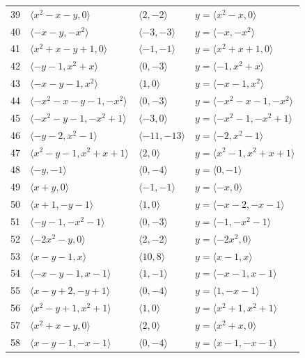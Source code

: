 \documentclass[11pt]{article}
\begin{document}
\begin{longtable}{@{}rlll@{}}
39 & $\langle x^{2}-x-y,0\rangle$ & $\langle 2,-2\rangle$ & $y=\langle x^{2}-x,0\rangle$\\
40 & $\langle -x-y,-x^{2}\rangle$ & $\langle -3,-3\rangle$ & $y=\langle -x,-x^{2}\rangle$\\
41 & $\langle x^{2}+x-y+1,0\rangle$ & $\langle -1,-1\rangle$ & $y=\langle x^{2}+x+1,0\rangle$\\
42 & $\langle -y-1,x^{2}+x\rangle$ & $\langle 0,-3\rangle$ & $y=\langle -1,x^{2}+x\rangle$\\
43 & $\langle -x-y-1,x^{2}\rangle$ & $\langle 1,0\rangle$ & $y=\langle -x-1,x^{2}\rangle$\\
44 & $\langle -x^{2}-x-y-1,-x^{2}\rangle$ & $\langle 0,-3\rangle$ & $y=\langle -x^{2}-x-1,-x^{2}\rangle$\\
45 & $\langle -x^{2}-y-1,-x^{2}+1\rangle$ & $\langle -3,0\rangle$ & $y=\langle -x^{2}-1,-x^{2}+1\rangle$\\
46 & $\langle -y-2,x^{2}-1\rangle$ & $\langle -11,-13\rangle$ & $y=\langle -2,x^{2}-1\rangle$\\
47 & $\langle x^{2}-y-1,x^{2}+x+1\rangle$ & $\langle 2,0\rangle$ & $y=\langle x^{2}-1,x^{2}+x+1\rangle$\\
48 & $\langle -y,-1\rangle$ & $\langle 0,-4\rangle$ & $y=\langle 0,-1\rangle$\\
49 & $\langle x+y,0\rangle$ & $\langle -1,-1\rangle$ & $y=\langle -x,0\rangle$\\
50 & $\langle x+1,-y-1\rangle$ & $\langle 1,0\rangle$ & $y=\langle -x-2,-x-1\rangle$\\
51 & $\langle -y-1,-x^{2}-1\rangle$ & $\langle 0,-3\rangle$ & $y=\langle -1,-x^{2}-1\rangle$\\
52 & $\langle -2x^{2}-y,0\rangle$ & $\langle 2,-2\rangle$ & $y=\langle -2x^{2},0\rangle$\\
53 & $\langle x-y-1,x\rangle$ & $\langle 10,8\rangle$ & $y=\langle x-1,x\rangle$\\
54 & $\langle -x-y-1,x-1\rangle$ & $\langle 1,-1\rangle$ & $y=\langle -x-1,x-1\rangle$\\
55 & $\langle x-y+2,-y+1\rangle$ & $\langle 0,-4\rangle$ & $y=\langle 1,-x-1\rangle$\\
56 & $\langle x^{2}-y+1,x^{2}+1\rangle$ & $\langle 1,0\rangle$ & $y=\langle x^{2}+1,x^{2}+1\rangle$\\
57 & $\langle x^{2}+x-y,0\rangle$ & $\langle 2,0\rangle$ & $y=\langle x^{2}+x,0\rangle$\\
58 & $\langle x-y-1,-x-1\rangle$ & $\langle 0,-4\rangle$ & $y=\langle x-1,-x-1\rangle$\\

\end{longtable}
\end{document}
